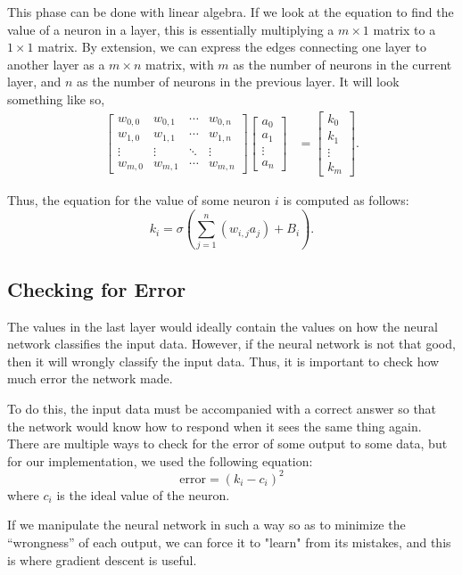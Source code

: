 \documentclass[a4paper, 11pt, english]{article}
\begin{document}
\par This phase can be done with linear algebra. If we look at the equation to find the value of a neuron in a layer, this is essentially multiplying a $m \times 1$ matrix to a $1 \times 1$ matrix. By extension, we can express the edges connecting one layer to another layer as a $m \times n$ matrix, with $m$ as the number of neurons in the current layer, and $n$ as the number of neurons in the previous layer. It will look something like so,
\begin{align*}
    \begin{bmatrix}
        w_{0,0} & w_{0,1} & \cdots & w_{0,n} \\
        w_{1,0} & w_{1,1} & \cdots & w_{1,n} \\
        \vdots & \vdots & \ddots & \vdots \\
        w_{m,0} & w_{m,1} & \cdots & w_{m,n}
    \end{bmatrix}
    \begin{bmatrix}
        a_0 \\
        a_1 \\
        \vdots \\
        a_n
    \end{bmatrix} &=
    \begin{bmatrix}
        k_0 \\
        k_1 \\
        \vdots \\
        k_m
    \end{bmatrix}.
\end{align*}
\par Thus, the equation for the value of some neuron $i$ is computed as follows:
\[k_i = \sigma(\sum_{j=1}^{n}(w_{i,j}a_{j}) + B_i).\]
\subsection{Checking for Error}
\par The values in the last layer would ideally contain the values on how the neural network classifies the input data. However, if the neural network is not that good, then it will wrongly classify the input data. Thus, it is important to check how much error the network made.
\par To do this, the input data must be accompanied with a correct answer so that the network would know how to respond when it sees the same thing again. There are multiple ways to check for the error of some output to some data, but for our implementation, we used the following equation:
\[\mathrm{error} = (k_i - c_i)^2 \]
where $c_i$ is the ideal value of the neuron.
\par If we manipulate the neural network in such a way so as to minimize the “wrongness” of each output, we can force it to "learn" from its mistakes, and this is where gradient descent is useful.
\end{document}
